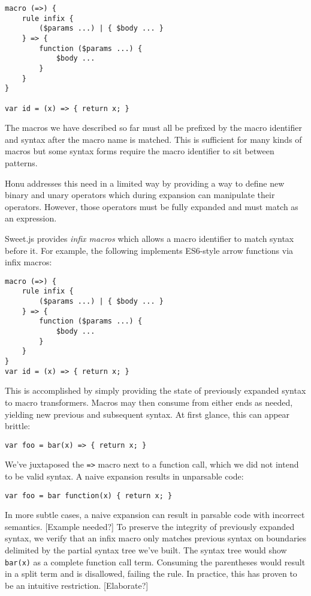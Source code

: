 \documentclass[preprint,10pt]{sigplanconf}
\begin{document}
\begin{verbatim}
macro (=>) {
    rule infix {
        ($params ...) | { $body ... }
    } => {
        function ($params ...) {
            $body ...
        }
    }
}

var id = (x) => { return x; }
\end{verbatim}

The macros we have described so far must all be prefixed by the macro
identifier and syntax after the macro name is matched. This is
sufficient for many kinds of macros but some syntax forms require the
macro identifier to sit between patterns.

Honu addresses this need in a limited way by providing a way to define
new binary and unary operators which during expansion can manipulate
their operators. However, those operators must be fully expanded and
must match as an expression.

Sweet.js provides \emph{infix macros} which allows a macro identifier to
match syntax before it. For example, the following implements
ES6-style arrow functions via infix macros:

\begin{verbatim}
macro (=>) {
    rule infix {
        ($params ...) | { $body ... }
    } => {
        function ($params ...) {
            $body ...
        }
    }
}
var id = (x) => { return x; }
\end{verbatim}

This is accomplished by simply providing the state of previously
expanded syntax to macro transformers. Macros may then consume from
either ends as needed, yielding new previous and subsequent syntax. At
first glance, this can appear brittle:

\begin{verbatim}
var foo = bar(x) => { return x; }
\end{verbatim}

We've juxtaposed the \verb!=>! macro next to a function call, which we did
not intend to be valid syntax. A naive expansion results in unparsable
code:

\begin{verbatim}
var foo = bar function(x) { return x; }
\end{verbatim}

In more subtle cases, a naive expansion can result in parsable code
with incorrect semantics. [Example needed?] To preserve the integrity
of previously expanded syntax, we verify that an infix macro only
matches previous syntax on boundaries delimited by the partial syntax
tree we've built. The syntax tree would show \verb!bar(x)! as a complete
function call term. Consuming the parentheses would result in a split
term and is disallowed, failing the rule. In practice, this has proven
to be an intuitive restriction. [Elaborate?]
\end{document}
